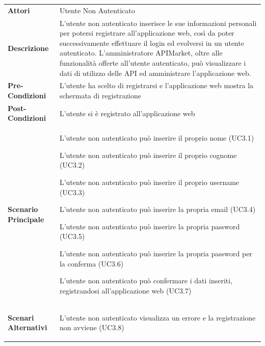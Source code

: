 \begin{longtable}{ l | p{11cm}}
	\hline
	\rowcolor{Gray}
	 \multicolumn{2}{c}{UC3 - Registrazione Utente} \\
	 \hline
	\textbf{Attori} & Utente Non Autenticato \\
	\textbf{Descrizione} & L'utente non autenticato inserisce le sue informazioni personali per potersi registrare all'applicazione web, così da poter successivamente effettuare il login ed evolversi in un utente autenticato.
	L'amministratore APIMarket, oltre alle funzionalità offerte all'utente autenticato, può
	visualizzare i dati di utilizzo delle API ed amministrare l'applicazione web.  \\
	\textbf{Pre-Condizioni} & L'utente ha scelto di registrarsi e l'applicazione web mostra la schermata di registrazione \\
	\textbf{Post-Condizioni} & L'utente si è registrato all'applicazione web \\
	\textbf{Scenario Principale} & \begin{enumerate*}[label=(\arabic*.),itemjoin={\newline}]
		\item L'utente non autenticato può inserire il proprio nome (UC3.1)
		\item L'utente non autenticato può inserire il proprio cognome (UC3.2)
		\item L'utente non autenticato può inserire il proprio username (UC3.3)
		\item L'utente non autenticato può inserire la propria email (UC3.4) 
		\item L'utente non autenticato può inserire la propria password (UC3.5)
		\item L'utente non autenticato può inserire la propria password per la conferma (UC3.6)
		\item L'utente non autenticato può confermare i dati inseriti, registrandosi all'applicazione web (UC3.7)
	\end{enumerate*}\\
	\textbf{Scenari Alternativi} & 
	\begin{enumerate*}[label=(\arabic*.),itemjoin={\newline}]
		\item L'utente non autenticato visualizza un errore e la registrazione non avviene (UC3.8)
	\end{enumerate*}\\
\end{longtable}
